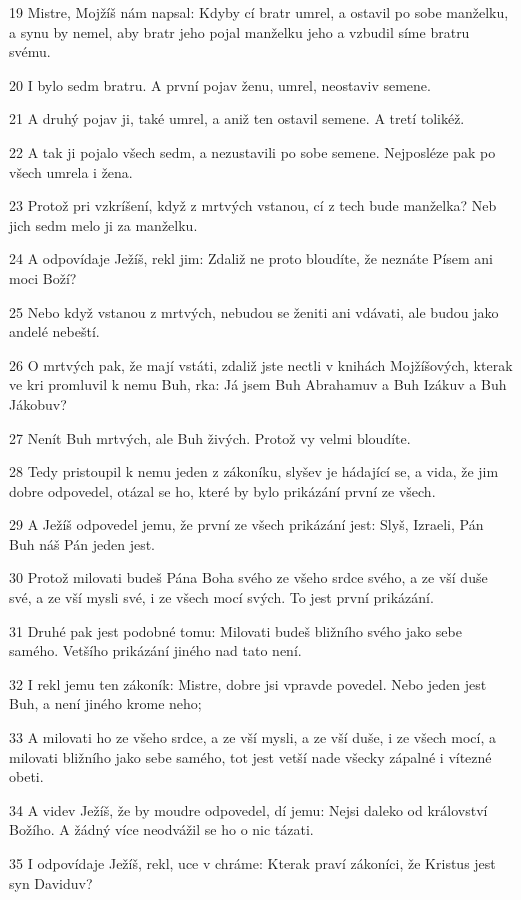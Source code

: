 \par 19 Mistre, Mojžíš nám napsal: Kdyby cí bratr umrel, a ostavil po sobe manželku, a synu by nemel, aby bratr jeho pojal manželku jeho a vzbudil síme bratru svému.
\par 20 I bylo sedm bratru. A první pojav ženu, umrel, neostaviv semene.
\par 21 A druhý pojav ji, také umrel, a aniž ten ostavil semene. A tretí tolikéž.
\par 22 A tak ji pojalo všech sedm, a nezustavili po sobe semene. Nejposléze pak po všech umrela i žena.
\par 23 Protož pri vzkríšení, když z mrtvých vstanou, cí z tech bude manželka? Neb jich sedm melo ji za manželku.
\par 24 A odpovídaje Ježíš, rekl jim: Zdaliž ne proto bloudíte, že neznáte Písem ani moci Boží?
\par 25 Nebo když vstanou z mrtvých, nebudou se ženiti ani vdávati, ale budou jako andelé nebeští.
\par 26 O mrtvých pak, že mají vstáti, zdaliž jste nectli v knihách Mojžíšových, kterak ve kri promluvil k nemu Buh, rka: Já jsem Buh Abrahamuv a Buh Izákuv a Buh Jákobuv?
\par 27 Nenít Buh mrtvých, ale Buh živých. Protož vy velmi bloudíte.
\par 28 Tedy pristoupil k nemu jeden z zákoníku, slyšev je hádající se, a vida, že jim dobre odpovedel, otázal se ho, které by bylo prikázání první ze všech.
\par 29 A Ježíš odpovedel jemu, že první ze všech prikázání jest: Slyš, Izraeli, Pán Buh náš Pán jeden jest.
\par 30 Protož milovati budeš Pána Boha svého ze všeho srdce svého, a ze vší duše své, a ze vší mysli své, i ze všech mocí svých. To jest první prikázání.
\par 31 Druhé pak jest podobné tomu: Milovati budeš bližního svého jako sebe samého. Vetšího prikázání jiného nad tato není.
\par 32 I rekl jemu ten zákoník: Mistre, dobre jsi vpravde povedel. Nebo jeden jest Buh, a není jiného krome neho;
\par 33 A milovati ho ze všeho srdce, a ze vší mysli, a ze vší duše, i ze všech mocí, a milovati bližního jako sebe samého, tot jest vetší nade všecky zápalné i vítezné obeti.
\par 34 A videv Ježíš, že by moudre odpovedel, dí jemu: Nejsi daleko od království Božího. A žádný více neodvážil se ho o nic tázati.
\par 35 I odpovídaje Ježíš, rekl, uce v chráme: Kterak praví zákoníci, že Kristus jest syn Daviduv?
